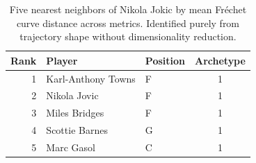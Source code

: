 \begin{table}[htbp]
  \centering\small
  \begin{tabular}{rllc}
    \toprule
    Rank & Player & Position & Archetype \\
    \midrule
    1 & Karl-Anthony Towns & F & 1 \\
    2 & Nikola Jovic & F & 1 \\
    3 & Miles Bridges & F & 1 \\
    4 & Scottie Barnes & G & 1 \\
    5 & Marc Gasol & C & 1 \\
    \bottomrule
  \end{tabular}
  \caption{Five nearest neighbors of Nikola Jokic by mean Fr\'{e}chet curve distance across metrics. Identified purely from trajectory shape without dimensionality reduction.}
  \label{tab:Nikola_Jokic_frechet_curve_neighbors}
\end{table}

